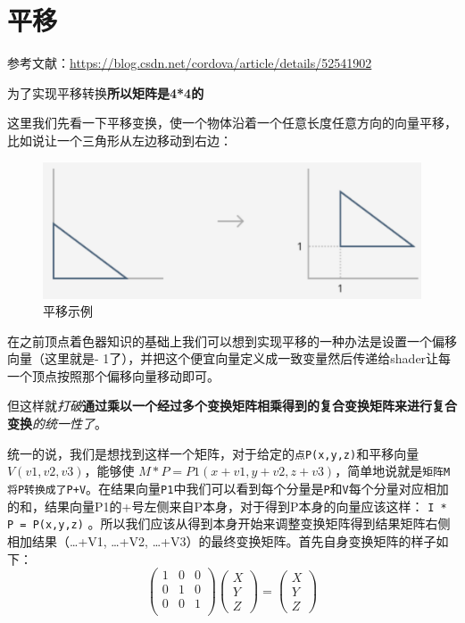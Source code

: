 \documentclass[UTF8,a4paper,12pt]{ctexbook}
\begin{document}
	\section{平移}
		参考文献：\url{https://blog.csdn.net/cordova/article/details/52541902}
		
		为了实现平移转换\textbf{所以矩阵是4*4的}
		
		
		这里我们先看一下平移变换，使一个物体沿着一个任意长度任意方向的向量平移，比如说让一个三角形从左边移动到右边：
			\begin{figure}[h]
				\centering
				\includegraphics[width=.7\linewidth]{transfer.png}
				\caption{平移示例}
			\end{figure}

		在之前顶点着色器知识的基础上我们可以想到实现平移的一种办法是设置一个偏移向量（这里就是- 1了），并把这个便宜向量定义成一致变量然后传递给shader让每一个顶点按照那个偏移向量移动即可。
		
		但这样就\textit{打破}\textbf{通过乘以一个经过多个变换矩阵相乘得到的复合变换矩阵来进行复合变换}\textit{的统一性了}。
		 
		统一的说，我们是想找到这样一个矩阵，对于给定的\verb|点P(x,y,z)|和平移向量$V(v1,v2,v3)$，能够使 $M * P = P1(x+v1, y+v2, z+v3) $，简单地说就是\verb|矩阵M将P转换成了P+V|。在结果向量\verb|P1|中我们可以看到每个分量是\verb|P|和\verb|V|每个分量对应相加的和，结果向量P1的+号左侧来自P本身，对于得到P本身的向量应该这样： 
		\verb|I * P = P(x,y,z)| 。所以我们应该从得到本身开始来调整变换矩阵得到结果矩阵右侧相加结果（…+V1, …+V2, …+V3）的最终变换矩阵。首先自身变换矩阵的样子如下：
			\begin{equation}
			 \left(
			\begin{array}{ccc}
			1 & 0 & 0\\
			
			0 & 1 & 0\\
			
			0 & 0 & 1\\
			\end{array}
			\right)
			\left(
			\begin{array}{c}
				X\\ 
				Y\\
				Z 
			\end{array}	
			\right) 
			=
			\left(
				\begin{array}{c}
				X\\ 
				Y\\
				Z 
				\end{array}	
			\right)
		\end{equation}
		
\end{document}
